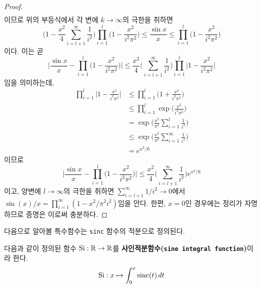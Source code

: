 \begin{proof}
\begin{align*}
    \end{align*}
    이므로 위의 부등식에서 각 변에 $k\to\infty$의 극한을 취하면
    \begin{equation*}
        \bigg(1-\frac{x^2}{4}\sum_{i=l+1}^\infty\frac{1}{i^2}\bigg)\prod_{i=1}^l\bigg(1-\frac{x^2}{i^2\pi^2}\bigg)\leq\frac{\sin x}{x}\leq\prod_{i=1}^l\bigg(1-\frac{x^2}{i^2\pi^2}\bigg)
    \end{equation*}
    이다. 이는 곧
    \begin{equation*}
        \bigg|\frac{\sin x}{x}-\prod_{i=1}^l\bigg(1-\frac{x^2}{i^2\pi^2}\bigg)\bigg|\leq\frac{x^2}{4}\bigg(\sum_{i=l+1}^\infty\frac{1}{i^2}\bigg)\prod_{i=1}^l\bigg|1-\frac{x^2}{i^2\pi^2}\bigg|
    \end{equation*}
    임을 의미하는데,
    \begin{align*}
        \prod_{i=1}^l\bigg|1-\frac{x^2}{i^2\pi^2}\bigg|&\leq\prod_{i=1}^l\bigg(1+\frac{x^2}{i^2\pi^2}\bigg)\\
        &\leq\prod_{i=1}^l\exp\bigg(\frac{x^2}{i^2\pi^2}\bigg)\\
        &=\exp\bigg(\frac{x^2}{\pi^2}\sum_{i=1}^l\frac{1}{i^2}\bigg)\\
        &\leq\exp\bigg(\frac{x^2}{\pi^2}\sum_{i=1}^\infty\frac{1}{i^2}\bigg)\\
        &=e^{x^2/6}
    \end{align*}
    이므로
    \begin{equation*}
        \bigg|\frac{\sin x}{x}-\prod_{i=1}^l\bigg(1-\frac{x^2}{i^2\pi^2}\bigg)\bigg|\leq\frac{x^2}{4}\bigg(\sum_{i=l+1}^\infty\frac{1}{i^2}\bigg)e^{x^2/6}
    \end{equation*}
    이고, 양변에 $l\to\infty$의 극한을 취하면 $\sum_{i=l+1}^\infty1/i^2\to0$에서 $\sin(x)/x=\prod_{i=1}^\infty(1-x^2/\pi^2i^2)$임을 안다. 한편, $x=0$인 경우에는 정리가 자명하므로 증명은 이로써 충분하다.
\end{proof}

다음으로 알아볼 특수함수는 \texttt{sinc} 함수의 적분으로 정의된다.

\begin{definition}
    다음과 같이 정의된 함수 $\mathrm{Si}:\mathbb{R}\to\mathbb{R}$를 \textbf{사인적분함수(\texttt{sine integral function})}이라 한다.
    \begin{equation*}
        \mathrm{Si}:x\mapsto\int_0^x\mathrm{sinc}(t)\,dt
    \end{equation*}
\end{definition}

